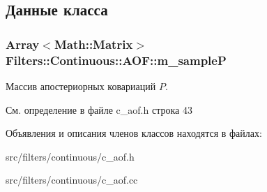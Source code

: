 \subsection{Данные класса}
\subsubsection[{\texorpdfstring{m\+\_\+sampleP}{m_sampleP}}]{\setlength{\rightskip}{0pt plus 5cm}Array$<$Math\+::\+Matrix$>$ Filters\+::\+Continuous\+::\+A\+O\+F\+::m\+\_\+sampleP\hspace{0.3cm}{\ttfamily [protected]}}\hypertarget{class_filters_1_1_continuous_1_1_a_o_f_a3cff90f7e12e677f04102f1717ef7a49}{}\label{class_filters_1_1_continuous_1_1_a_o_f_a3cff90f7e12e677f04102f1717ef7a49}
Массив апостериорных ковариаций $P$. 

См. определение в файле c\+\_\+aof.\+h строка 43



Объявления и описания членов классов находятся в файлах\+:\begin{DoxyCompactItemize}
\item 
src/filters/continuous/c\+\_\+aof.\+h\item 
src/filters/continuous/c\+\_\+aof.\+cc\end{DoxyCompactItemize}
